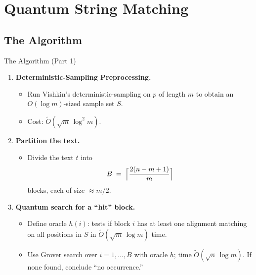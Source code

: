 \documentclass{beamer}
\begin{document}
\section{Quantum String Matching}

\subsection{The Algorithm}
\begin{frame}{The Algorithm (Part 1)}
  \begin{enumerate}
    \item \textbf{Deterministic-Sampling Preprocessing.}
          \begin{itemize}
            \item Run Vishkin's deterministic-sampling on \(p\) of length \(m\) to obtain an \(O(\log m)\)-sized sample set \(S\).
            \item Cost: \(\widetilde O(\sqrt{m}\,\log^2 m)\).
          \end{itemize}
    \item \textbf{Partition the text.}
          \begin{itemize}
            \item Divide the text \(t\) into
                  \[
                    B \;=\; \Bigl\lceil \frac{2(n - m + 1)}{m} \Bigr\rceil
                  \]
                  blocks, each of size \(\approx m/2\).
          \end{itemize}
    \item \textbf{Quantum search for a “hit” block.}
          \begin{itemize}
            \item Define oracle \(h(i)\): tests if block \(i\) has at least one alignment matching on all positions in \(S\) in \(\widetilde O(\sqrt{m}\,\log m)\) time.
            \item Use Grover search over \(i=1,\dots,B\) with oracle \(h\); time \(\widetilde O(\sqrt{n}\,\log m)\). If none found, conclude “no occurrence.”
          \end{itemize}
  \end{enumerate}
\end{frame}
\end{document}
